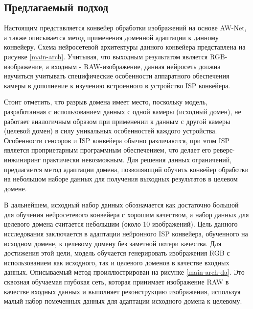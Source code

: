 \subsection{Предлагаемый подход}\label{sect-2-1}

Настоящим представляется конвейер обработки изображений на основе AW-Net, а также описывается метод применения доменной адаптации к данному конвейеру. Схема нейросетевой архитектуры данного конвейера представлена на рисунке \ref{main-arch}. Учитывая, что выходным результатом является RGB-изображение, а входным - RAW-изображение, данная нейросеть должна научиться учитывать специфические особенности аппаратного обеспечения камеры в дополнение к изучению встроенного в устройство ISP конвейера.


Стоит отметить, что разрыв домена имеет место, поскольку модель, разработанная с использованием данных с одной камеры (исходный домен), не работает аналогичным образом при применении к данным с другой камеры (целевой домен) в силу уникальных особенностей каждого устройства. Особенности сенсоров и ISP конвейера обычно различаются, при этом ISP является проприетарным программным обеспечением, что делает его реверс-инжиниринг практически невозможным. Для решения данных ограничений, предлагается метод адаптации домена, позволяющий обучить конвейер обработки на небольшом наборе данных для получения выходных результатов в целевом домене.


В дальнейшем, исходный набор данных обозначается как достаточно большой для обучения нейросетевого конвейера с хорошим качеством, а набор данных для целевого домена считается небольшим (около 10 изображений). Цель данного исследования заключается в адаптации нейронного ISP конвейера, обученного на исходном домене, к целевому домену без заметной потери качества. Для достижения этой цели, модель обучается генерировать изображения RGB с использованием как исходного, так и целевого доменов в качестве входных данных. Описываемый метод проиллюстрирован на рисунке \ref{main-arch-da}. Это сквозная обучаемая глубокая сеть, которая принимает изображение RAW в качестве входных данных и выполняет реконструкцию изображения, используя малый набор помеченных данных для адаптации исходного домена к целевому.


